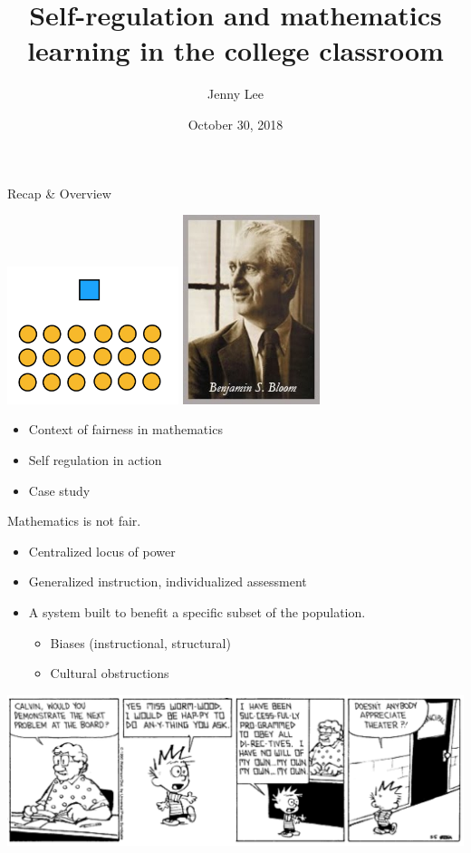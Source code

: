 \documentclass{beamer}
\title{Self-regulation and mathematics learning in the college classroom}
\date{October 30, 2018}
\author{Jenny Lee}
\institute{Harvey Mudd College\\Advisor: Dagan Karp}
\begin{document}
\maketitle
\begin{frame}{Recap \& Overview}

  \includegraphics[width=5cm]{lecturestyle1}
  \hfill
  \includegraphics[width=4cm]{bloom.jpg}

  \begin{itemize}
    \item Context of fairness in mathematics
    \item Self regulation in action
    \item Case study
  \end{itemize}
\end{frame}
\begin{frame}{Mathematics is not fair.}
  \begin{itemize}
  \item Centralized locus of power\pause
  \item Generalized instruction, individualized assessment\pause
  \item A system built to benefit a specific subset of the population.
  \begin{itemize}
    \item Biases (instructional, structural)
    \item Cultural obstructions
  \end{itemize}
  \end{itemize}

      \includegraphics[width=\textwidth]{ch3}

\end{frame}
\end{document}
